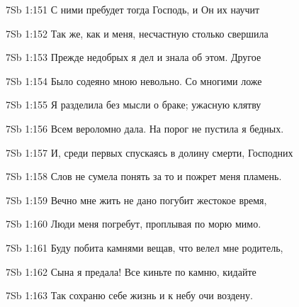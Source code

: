 \vs 7Sb 1:151 С ними пребудет тогда Господь, и Он их научит 

\vs 7Sb 1:152 Так же, как и меня, несчастную  столько свершила 

\vs 7Sb 1:153 Прежде недобрых я дел и знала об этом. Другое 

\vs 7Sb 1:154 Было содеяно мною невольно. Со многими ложе 

\vs 7Sb 1:155 Я разделила без мысли о браке; ужасную клятву

\vs 7Sb 1:156 Всем вероломно дала. На порог не пустила я бедных. 

\vs 7Sb 1:157 И, среди первых спускаясь в долину смерти, Господних

\vs 7Sb 1:158 Слов не сумела понять  за то и пожрет меня пламень. 

\vs 7Sb 1:159 Вечно мне жить не дано  погубит жестокое время, 

\vs 7Sb 1:160 Люди меня погребут, проплывая по морю мимо. 

\vs 7Sb 1:161 Буду побита камнями вещав, что велел мне родитель, 

\vs 7Sb 1:162 Сына я предала! Все киньте по камню, кидайте  

\vs 7Sb 1:163 Так сохраню себе жизнь и к небу очи воздену.

